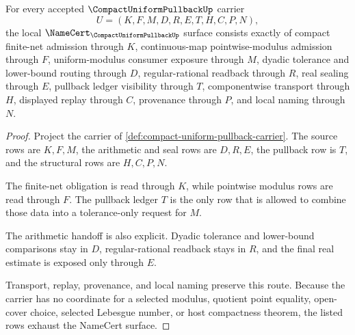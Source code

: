 \begin{theorem}
\label{thm:compact-uniform-pullback-namecert-obligations}
For every accepted $\CompactUniformPullbackUp$ carrier
$$
U=(K,F,M,D,R,E,T,H,C,P,N),
$$
the local $\NameCert_{\CompactUniformPullbackUp}$ surface consists exactly of compact finite-net admission through $K$, continuous-map pointwise-modulus admission through $F$, uniform-modulus consumer exposure through $M$, dyadic tolerance and lower-bound routing through $D$, regular-rational readback through $R$, real sealing through $E$, pullback ledger visibility through $T$, componentwise transport through $H$, displayed replay through $C$, provenance through $P$, and local naming through $N$.
\end{theorem}
\begin{proof}
Project the carrier of \autoref{def:compact-uniform-pullback-carrier}. The source rows are $K,F,M$, the arithmetic and seal rows are $D,R,E$, the pullback row is $T$, and the structural rows are $H,C,P,N$.

The finite-net obligation is read through $K$, while pointwise modulus rows are read through $F$. The pullback ledger $T$ is the only row that is allowed to combine those data into a tolerance-only request for $M$.

The arithmetic handoff is also explicit. Dyadic tolerance and lower-bound comparisons stay in $D$, regular-rational readback stays in $R$, and the final real estimate is exposed only through $E$.

Transport, replay, provenance, and local naming preserve this route. Because the carrier has no coordinate for a selected modulus, quotient point equality, open-cover choice, selected Lebesgue number, or host compactness theorem, the listed rows exhaust the NameCert surface.
\end{proof}

